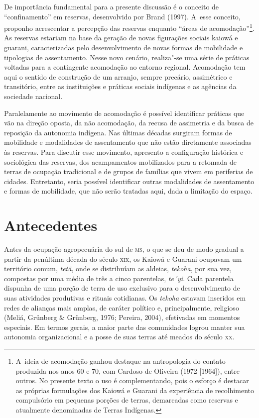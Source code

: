 De importância fundamental para a presente discussão é o conceito de
``confinamento'' em reservas, desenvolvido por Brand (1997). A~esse
conceito, proponho acrescentar a percepção das reservas enquanto ``áreas
de acomodação''\footnote{A~ideia de acomodação ganhou destaque na
antropologia do contato produzida nos anos 60 e 70, com Cardoso de
Oliveira (1972 [1964]), entre outros. No presente texto o uso é
complementando, pois o esforço é destacar as próprias formulações dos
Kaiowá e Guarani da experiência de recolhimento compulsório em pequenas
porções de terras, demarcadas como reservas e atualmente denominadas de
Terras Indígenas.}. As reservas estariam na base da geração de novas
figurações sociais kaiowá e guarani, caracterizadas pelo
desenvolvimento de novas formas de mobilidade e tipologias de
assentamento. Nesse novo cenário, realiza"-se uma série de práticas
voltadas para a contingente acomodação ao entorno regional. Acomodação
tem aqui o sentido de construção de um arranjo, sempre precário,
assimétrico e transitório, entre as instituições e práticas sociais
indígenas e as agências da sociedade nacional.

Paralelamente ao movimento de acomodação é possível identificar práticas
que vão na direção oposta, da não acomodação, da recusa de assimetria e
da busca de reposição da autonomia indígena. Nas últimas décadas
surgiram formas de mobilidade e modalidades de assentamento que não
estão diretamente associadas às reservas. Para discutir esse movimento,
apresento a configuração histórica e sociológica das reservas, dos
acampamentos mobilizados para a retomada de terras de ocupação
tradicional e de grupos de famílias que vivem em periferias de cidades.
Entretanto, seria possível identificar outras modalidades de
assentamento e formas de mobilidade, que não serão tratadas aqui, dada
a limitação do espaço. 

\section{Antecedentes}

Antes da ocupação agropecuária do sul de \textsc{ms}, o que se deu de modo
gradual a partir da penúltima década do século \textsc{xix}, os Kaiowá e Guarani
ocupavam um território comum, \emph{tetã}, onde se distribuíam as aldeias,
\emph{tekoha}, por sua vez, compostas por uma média de três a cinco
parentelas, \emph{te´yi}. Cada parentela dispunha de uma porção de terra de
uso exclusivo para o desenvolvimento de suas atividades produtivas e
rituais cotidianas. Os \emph{tekoha} estavam inseridos em redes de alianças
mais amplas, de caráter político e, principalmente, religioso (Meliá,
Grünberg \& Grünberg, 1976; Pereira, 2004), efetivadas em momentos
especiais. Em termos gerais, a maior parte das comunidades logrou
manter sua autonomia organizacional e a posse de suas terras até meados
do século \textsc{xx}.

